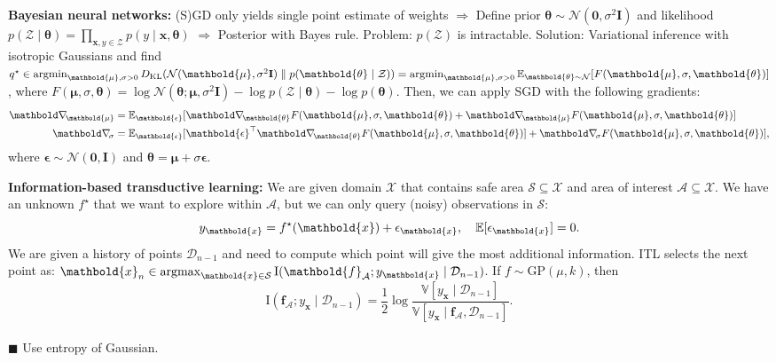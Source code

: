 \documentclass[9pt]{extarticle}
\newenvironment{topic}[1]
{\textbf{\sffamily \colorbox{black}{\rlap{\textbf{\textcolor{white}{#1}}}\hspace{\linewidth}\hspace{-2\fboxsep}}}}
{}
\newenvironment{subtopic}[1]
{\textbf{\sffamily #1:}}
{}
\renewcommand{\mat}[1]{\ensuremath{\mathbf{#1}}}
\renewcommand{\vec}[1]{\ensuremath{\mathbold{#1}}}
\renewcommand{\Var}{\mathbb{V}}
\begin{document}
\begin{multicols*}{3}
\begin{topic}{Uncertainty quantification}
        \begin{subtopic}{Bayesian neural networks}
            (S)GD only yields single point estimate of weights $\Rightarrow$ Define prior
            $\vec{\theta} \sim \mathcal{N}(\vec{0}, \sigma^2 \mat{I})$ and likelihood $p(\mathcal{Z}
                \mid \vec{\theta}) = \prod_{\vec{x},y \in \mathcal{Z}} p(y \mid \vec{x}, \vec{\theta})$
            $\Rightarrow$ Posterior with Bayes rule. Problem: $p(\mathcal{Z})$ is intractable.
            Solution: Variational inference with isotropic Gaussians and find $q^\star \in \argmin_{\vec{\mu}, \sigma > 0} D_{\mathrm{KL}} (\mathcal{N}(\vec{\mu}, \sigma^2 \mat{I}) \;\|\; p(\vec{\theta} \mid \mathcal{Z})) = \argmin_{\vec{\mu}, \sigma > 0} \E_{\vec{\theta} \sim \mathcal{N}} [F(\vec{\mu}, \sigma, \vec{\theta})]$,
            where $F(\vec{\mu}, \sigma, \vec{\theta}) = \log \mathcal{N}(\vec{\theta}; \vec{\mu}, \sigma^2 \mat{I}) - \log p(\mathcal{Z} \mid \vec{\theta}) - \log p(\vec{\theta})$. Then, we can apply SGD with the following gradients:
            \begin{align*}
                \grad{}{\vec{\mu}} & = \E_{\vec{\epsilon}} [\grad{F(\vec{\mu}, \sigma, \vec{\theta})}{\vec{\theta}} + \grad{F(\vec{\mu}, \sigma, \vec{\theta})}{\vec{\mu}}]                           \\
                \grad{}{\sigma}    & = \E_{\vec{\epsilon}} [\transpose{\vec{\epsilon}} \grad{F(\vec{\mu}, \sigma, \vec{\theta})}{\vec{\theta}}] + \grad{F(\vec{\mu}, \sigma, \vec{\theta})}{\sigma}],
            \end{align*}
            where $\vec{\epsilon} \sim \mathcal{N}(\vec{0}, \mat{I})$ and $\vec{\theta} = \vec{\mu} + \sigma \vec{\epsilon}$.

        \end{subtopic}

        \begin{subtopic}{Information-based transductive learning}
            We are given domain $\mathcal{X}$ that contains safe area $\mathcal{S} \subseteq \mathcal{X}$ and
            area of interest $\mathcal{A} \subseteq \mathcal{X}$. We have an unknown $f^\star$ that we want to
            explore within $\mathcal{A}$, but we can only query (noisy) observations in $\mathcal{S}$: \[
                y_{\vec{x}} = f^\star(\vec{x}) + \epsilon_{\vec{x}}, \quad \E[\epsilon_{\vec{x}}] = 0.
            \]
            We are given a history of points $\mathcal{D}_{n-1}$ and need to compute which point will give the
            most additional information. ITL selects the next point as: $\vec{x}_n \in \argmax_{\vec{x} \in
                \mathcal{S}} \mathrm{I}(\vec{f}_{\mathcal{A}}; y_{\vec{x}} \mid \mathcal{D}_{n-1})$. If $f \sim
                \mathrm{GP}(\mu, k)$, then \[
                \mathrm{I}(\vec{f}_{\mathcal{A}}; y_{\vec{x}} \mid \mathcal{D}_{n-1}) = \frac{1}{2} \log \frac{\Var[y_{\vec{x}} \mid \mathcal{D}_{n-1}]}{\Var[y_{\vec{x}} \mid \vec{f}_{\mathcal{A}}, \mathcal{D}_{n-1}]}.
            \]
            \\ $\blacksquare$ Use entropy of Gaussian.


\end{subtopic}
\end{topic}
\end{multicols*}
\end{document}
